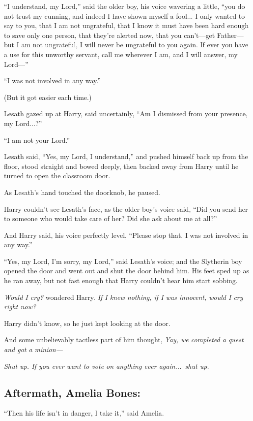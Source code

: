 “I understand, my Lord,” said the older boy, his voice wavering a little, “you do not trust my cunning, and indeed I have shown myself a fool... I only wanted to say to you, that I am not ungrateful, that I know it must have been hard enough to save only one person, that they’re alerted now, that you can’t—get Father—but I am not ungrateful, I will never be ungrateful to you again. If ever you have a use for this unworthy servant, call me wherever I am, and I will answer, my Lord—”

“I was not involved in any way.”

(But it got easier each time.)

Lesath gazed up at Harry, said uncertainly, “Am I dismissed from your presence, my Lord...?”

“I am not your Lord.”

Lesath said, “Yes, my Lord, I understand,” and pushed himself back up from the floor, stood straight and bowed deeply, then backed away from Harry until he turned to open the classroom door.

As Lesath’s hand touched the doorknob, he paused.

Harry couldn’t see Lesath’s face, as the older boy’s voice said, “Did you send her to someone who would take care of her? Did she ask about me at all?”

And Harry said, his voice perfectly level, “Please stop that. I was not involved in any way.”

“Yes, my Lord, I’m sorry, my Lord,” said Lesath’s voice; and the Slytherin boy opened the door and went out and shut the door behind him. His feet sped up as he ran away, but not fast enough that Harry couldn’t hear him start sobbing.

\emph{Would I cry?} wondered Harry. \emph{If I knew nothing, if I was innocent, would I cry right now?}

Harry didn’t know, so he just kept looking at the door.

And some unbelievably tactless part of him thought, \emph{Yay, we completed a quest and got a minion—}

\emph{Shut up. If you ever want to vote on anything ever again...\ shut up.}
\replacement{\sbreak}{}

\subsection{Aftermath, Amelia Bones:}

\noindent{}“Then his life isn’t in danger, I take it,” said Amelia.

